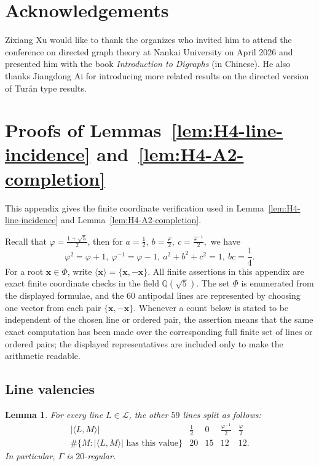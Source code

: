 \documentclass[11pt]{article}
\newtheorem{lemma}[theorem]{Lemma}
\theoremstyle{definition}
\begin{document}
\section*{Acknowledgements}
Zixiang Xu would like to thank the organizes who invited him to attend the conference on directed graph theory at Nankai University on April 2026 and presented him with the book
\emph{Introduction to Digraphs} (in Chinese). He also thanks Jiangdong Ai for introducing more related results on the directed version of Tur\'{a}n type results.








\appendix

\section{Proofs of Lemmas~\ref{lem:H4-line-incidence} and~\ref{lem:H4-A2-completion} }
\label{app:H4-counts}

This appendix gives the finite coordinate verification used in
Lemma~\ref{lem:H4-line-incidence} and
Lemma~\ref{lem:H4-A2-completion}.

Recall that \(\varphi=\frac{1+\sqrt{5}}{2}\), then for \(
    a=\frac{1}{2},\ b=\frac{\varphi}{2},\ c=\frac{\varphi^{-1}}{2},
\) we have
\[
    \varphi^{2}=\varphi+1,\ \varphi^{-1}=\varphi-1,\ a^{2}+b^{2}+c^{2}=1,\ bc=\frac{1}{4}.
\]
For a root \(\boldsymbol{x}\in\Phi\), write
\(\langle\boldsymbol{x}\rangle=\{\boldsymbol{x},-\boldsymbol{x}\}\).  
All finite assertions in this appendix are exact finite coordinate checks in
the field \(\mathbb Q(\sqrt{5})\).  
The set \(\Phi\) is enumerated from
the displayed formulae, and the \(60\) antipodal lines are represented by
choosing one vector from each pair \(\{\boldsymbol{x},-\boldsymbol{x}\}\).
Whenever a count below is stated to be independent of the chosen line or
ordered pair, the assertion means that the same exact computation has been
made over the corresponding full finite set of lines or ordered pairs; the
displayed representatives are included only to make the arithmetic
readable.

\subsection{Line valencies}
\label{app:H4-line-valencies}

\begin{lemma}\label{lem:app-H4-line-valencies}
For every line \(L\in\mathcal L\), the other \(59\) lines split as follows:
\begin{equation}\label{eq:app-H4-line-valencies}
\begin{array}{c|cccc}
|\langle L,M\rangle|
& \frac{1}{2} & 0 & \frac{\varphi^{-1}}{2} & \frac{\varphi}{2} \\
\hline
\#\{M:|\langle L,M\rangle|\text{ has this value}\}
& 20 & 15 & 12 & 12 .
\end{array}
\end{equation}
In particular, \(\Gamma\) is \(20\)-regular.
\end{lemma}
\end{document}
